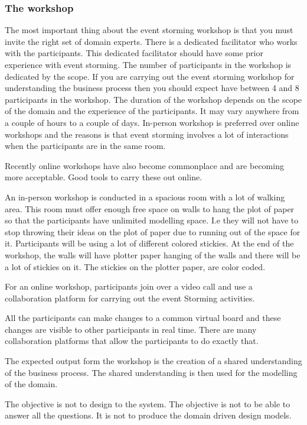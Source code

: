 \subsubsection{The workshop}
The most important thing about the event storming workshop is that you must invite the right set of domain experts.
There is a dedicated facilitator who works with the participants.
This dedicated facilitator should have some prior experience with event storming.
The number of participants in the workshop is dedicated by the scope.
If you are carrying out the event storming workshop for understanding the business process then you should expect have between 4 and 8 participants in the workshop.
The duration of the workshop depends on the scope of the domain and the experience of the participants.
It may vary anywhere from a couple of hours to a couple of days.
In-person workshop is preferred over online workshops and the reasons is that event storming involves a lot of interactions when the participants are in the same room.

Recently online workshops have also become commonplace and are becoming more acceptable.
Good tools to carry these out online.

An in-person workshop is conducted in a spacious room with a lot of walking area.
This room must offer enough free space on walls to hang the plot of paper so that the participants have unlimited modelling space.
I.e they will not have to stop throwing their ideas on the plot of paper due to running out of the space for it.
Participants will be using a lot of different colored stickies.
At the end of the workshop, the walls will have plotter paper hanging of the walls and there will be a lot of stickies on it.
The stickies on the plotter paper, are color coded.

For an online workshop, participants join over a video call and use a collaboration platform for carrying out the event Storming activities.

All the participants can make changes to a common virtual board and these changes are visible to other participants in real time.
There are many collaboration platforms that allow the participants to do exactly that.

The expected output form the workshop is the creation of a shared understanding of the business process.
The shared understanding is then used for the modelling of the domain.

The objective is not to design to the system.
The objective is not to be able to answer all the questions.
It is not to produce the domain driven design models.

